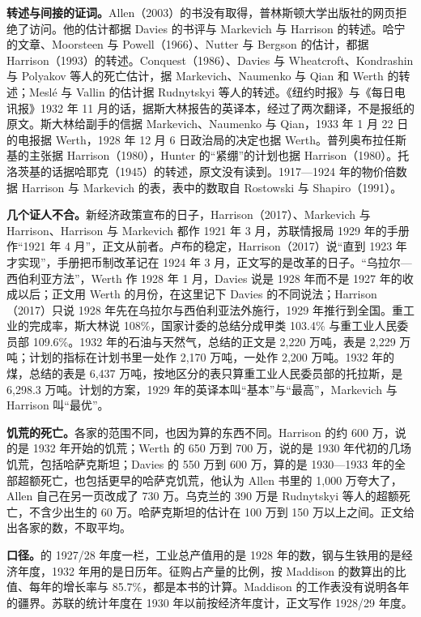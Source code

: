 \begin{deeper}[史料说明]
\textbf{转述与间接的证词。}Allen（2003）的书没有取得，普林斯顿大学出版社的网页拒绝了访问。他的估计都据 Davies 的书评与 Markevich 与 Harrison 的转述。哈宁的文章、Moorsteen 与 Powell（1966）、Nutter 与 Bergson 的估计，都据 Harrison（1993）的转述。Conquest（1986）、Davies 与 Wheatcroft、Kondrashin 与 Polyakov 等人的死亡估计，据 Markevich、Naumenko 与 Qian 和 Werth 的转述；Meslé 与 Vallin 的估计据 Rudnytskyi 等人的转述。《纽约时报》与《每日电讯报》1932 年 11 月的话，据斯大林报告的英译本，经过了两次翻译，不是报纸的原文。斯大林给副手的信据 Markevich、Naumenko 与 Qian，1933 年 1 月 22 日的电报据 Werth，1928 年 12 月 6 日政治局的决定也据 Werth。普列奥布拉任斯基的主张据 Harrison（1980），Hunter 的“紧绷”的计划也据 Harrison（1980）。托洛茨基的话据哈耶克（1945）的转述，原文没有读到。1917—1924 年的物价倍数据 Harrison 与 Markevich 的表，表中的数取自 Rostowski 与 Shapiro（1991）。

\textbf{几个证人不合。}新经济政策宣布的日子，Harrison（2017）、Markevich 与 Harrison、Harrison 与 Markevich 都作 1921 年 3 月，苏联情报局 1929 年的手册作“1921 年 4 月”，正文从前者。卢布的稳定，Harrison（2017）说“直到 1923 年才实现”，手册把币制改革记在 1924 年 3 月，正文写的是改革的日子。“乌拉尔—西伯利亚方法”，Werth 作 1928 年 1 月，Davies 说是 1928 年而不是 1927 年的收成以后；正文用 Werth 的月份，在这里记下 Davies 的不同说法；Harrison（2017）只说 1928 年先在乌拉尔与西伯利亚法外施行，1929 年推行到全国。重工业的完成率，斯大林说 108\%，国家计委的总结分成甲类 103.4\% 与重工业人民委员部 109.6\%。1932 年的石油与天然气，总结的正文是 2,220 万吨，表是 2,229 万吨；计划的指标在计划书里一处作 2,170 万吨，一处作 2,200 万吨。1932 年的煤，总结的表是 6,437 万吨，按地区分的表只算重工业人民委员部的托拉斯，是 6,298.3 万吨。计划的方案，1929 年的英译本叫“基本”与“最高”，Markevich 与 Harrison 叫“最优”。

\textbf{饥荒的死亡。}各家的范围不同，也因为算的东西不同。Harrison 的约 600 万，说的是 1932 年开始的饥荒；Werth 的 650 万到 700 万，说的是 1930 年代初的几场饥荒，包括哈萨克斯坦；Davies 的 550 万到 600 万，算的是 1930—1933 年的全部超额死亡，也包括更早的哈萨克饥荒，他认为 Allen 书里的 1,000 万夸大了，Allen 自己在另一页改成了 730 万。乌克兰的 390 万是 Rudnytskyi 等人的超额死亡，不含少出生的 60 万。哈萨克斯坦的估计在 100 万到 150 万以上之间。正文给出各家的数，不取平均。

\textbf{口径。}的 1927/28 年度一栏，工业总产值用的是 1928 年的数，钢与生铁用的是经济年度，1932 年用的是日历年。征购占产量的比例，按 Maddison 的数算出的比值、每年的增长率与 85.7\%，都是本书的计算。Maddison 的工作表没有说明各年的疆界。苏联的统计年度在 1930 年以前按经济年度计，正文写作 1928/29 年度。


\end{deeper}
